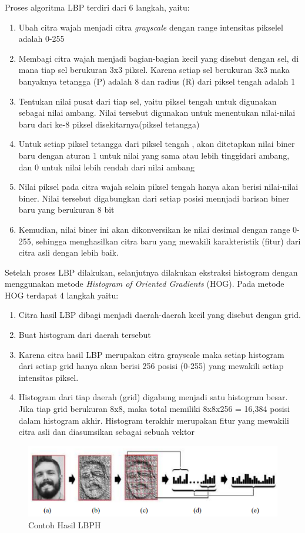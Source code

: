 Proses algoritma LBP terdiri dari 6 langkah, yaitu:
\begin{enumerate}
    \item Ubah citra wajah menjadi citra \emph{grayscale} dengan range intensitas pikselel adalah 0-255
    \item Membagi citra wajah menjadi bagian-bagian kecil yang disebut dengan sel, di mana tiap sel berukuran 3x3 piksel. 
        Karena setiap sel berukuran 3x3 maka banyaknya tetangga (P) adalah 8 dan radius (R) dari piksel tengah adalah 1
    \item Tentukan nilai pusat dari tiap sel, yaitu piksel tengah untuk digunakan sebagai nilai ambang. Nilai tersebut digunakan untuk menentukan nilai-nilai baru dari ke-8 piksel disekitarnya(piksel tetangga)
    \item Untuk setiap piksel tetangga dari piksel tengah , akan ditetapkan nilai biner baru dengan aturan 1 untuk nilai yang sama atau lebih tinggidari ambang, dan 0 untuk nilai lebih rendah dari nilai ambang
    \item Nilai piksel pada citra wajah selain piksel tengah hanya akan berisi nilai-nilai biner. Nilai tersebut digabungkan dari setiap posisi mennjadi barisan biner baru yang berukuran 8 bit
    \item Kemudian, nilai biner ini akan dikonversikan ke nilai desimal dengan range 0-255, sehingga menghasilkan citra baru  yang mewakili karakteristik (fitur) dari citra asli dengan lebih baik.
\end{enumerate}

Setelah proses LBP dilakukan, selanjutnya dilakukan ekstraksi histogram dengan menggunakan metode \emph{Histogram of Oriented Gradients} (HOG). Pada metode HOG terdapat 4 langkah yaitu:
\begin{enumerate}
    \item Citra hasil LBP dibagi menjadi daerah-daerah kecil yang disebut dengan grid. 
    \item Buat histogram dari daerah tersebut
    \item Karena citra hasil LBP merupakan citra grayscale maka setiap histogram dari setiap grid hanya akan berisi 256 posisi (0-255) yang mewakili setiap intensitas piksel. 
    \item Histogram dari tiap daerah (grid) digabung menjadi satu histogram besar. Jika tiap grid berukuran 8x8, maka total memiliki 8x8x256 = 16,384 posisi dalam histogram akhir. 
    Histogram terakhir merupakan fitur yang mewakili citra asli dan diasumsikan sebagai sebuah vektor
\end{enumerate}
\begin{figure}[h!]
    \centering
    \includegraphics[width=0.7\linewidth]{images/lbph.PNG}
    \caption{Contoh Hasil LBPH}
\end{figure}

